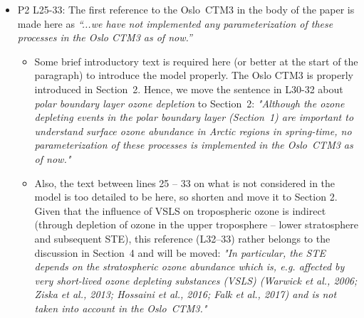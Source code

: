 \begin{itemize}
\item {\color{blue}  P2 L25-33: The first reference to the Oslo~CTM3 in the body of the paper is
  made here as \emph{“...we have not implemented any parameterization of these processes
    in the Oslo CTM3 as of now.”} }
  \begin{itemize}
  \item {\color{blue} Some brief introductory text is required here (or better at
    the start of the paragraph) to introduce the model properly.}
    The Oslo CTM3 is properly introduced in Section~2. Hence, we move the sentence in L30-32 about \emph{polar boundary layer ozone depletion} to Section~2:
    \emph{"Although the ozone depleting events in the polar boundary layer (Section~1) are important to understand surface ozone abundance in Arctic regions in spring-time, no parameterization of these processes is implemented in the Oslo~CTM3 as of now."}
  \item {\color{blue} Also, the text between lines
    25 -- 33 on what is not considered in the model is too detailed to be here, so shorten
    and move it to Section 2.}
    Given that the influence of VSLS on tropospheric ozone is indirect (through depletion of ozone in the upper troposphere -- lower stratosphere and subsequent STE), this reference (L32--33) rather belongs to the discussion in Section~4 and will be moved:
    \emph{"In particular, the STE depends on the stratospheric ozone abundance which is, e.g. affected by very short-lived ozone depleting substances (VSLS) (Warwick et al., 2006; Ziska et al., 2013; Hossaini et al., 2016; Falk et al., 2017) and is not taken into account in the Oslo~CTM3."}
  \end{itemize}


\end{itemize}
